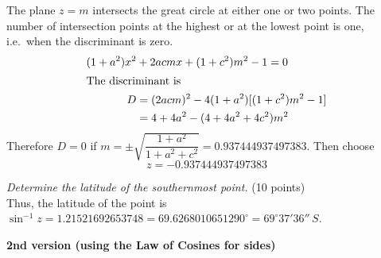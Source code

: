 \begin{description}
  The plane $z = m$ intersects the great circle at either one or two
  points. The number of intersection points at the highest or at the lowest
  point is one, i.e.\ when the discriminant is zero.
  \begin{align*}
  (1 + a^2)x^2 &+ 2acmx + (1 + c^2)m^2 - 1 = 0\\
  \intertext{The discriminant is}
  D &= (2acm)^2 - 4(1 + a^2)[(1 + c^2)m^2 - 1]\\
    &= 4 + 4a^2 - (4 + 4a^2 + 4c^2)m^2
  \end{align*}
  Therefore $D = 0$ if
  $m = \pm\sqrt{\dfrac{1 + a^2}{1 + a^2 + c^2}} = 0.937444937497383$. Then
  choose
  \[ z = -0.937444937497383 \]
\item[5.] \emph{Determine the latitude of the southernmost point.}
  \hfill(10 points)\\
  Thus, the latitude of the point is
  $\sin^{-1} z = 1.21521692653748 = 69.6268010651290^\circ
   = 69^\circ 37' 36''\,S$.
\end{description}

\textbf{2nd version (using the Law of Cosines for sides)}

